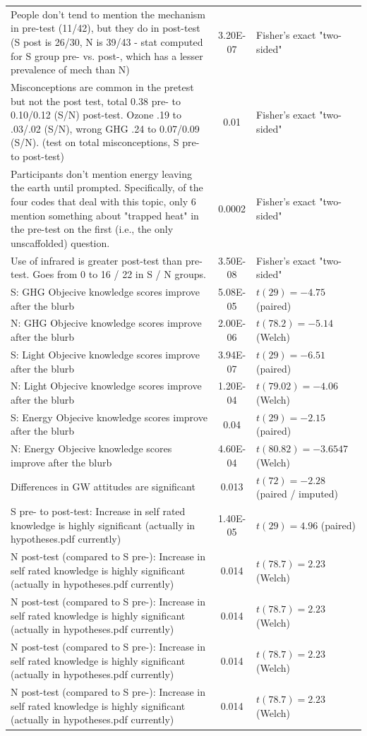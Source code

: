 \begin{longtabu}{X[2.5]S[table-parse-only]X[l]}
People don't tend to mention the mechanism in pre-test (11/42), but they do in
post-test (S post is 26/30, N is 39/43 - stat computed for S group pre- vs.
post-, which has a lesser prevalence of mech than N) & 3.20E-07 &
Fisher's exact "two-sided" \\
Misconceptions are common in the pretest but not the post test, total 0.38 pre-
to 0.10/0.12 (S/N) post-test. Ozone .19 to .03/.02 (S/N),  wrong GHG  .24 to
0.07/0.09 (S/N). (test on total misconceptions, S pre- to post-test) & 0.01
& Fisher's exact "two-sided" \\
Participants don't mention energy leaving the earth until prompted.
Specifically, of the four codes that deal with this topic, only 6 mention
something about "trapped heat" in the pre-test on the first (i.e., the only
unscaffolded) question. & 0.0002 & Fisher's exact "two-sided" \\
Use of infrared is greater post-test than pre-test. Goes from 0 to 16 / 22 in S
/ N groups. & 3.50E-08 & Fisher's exact "two-sided" \\
S: GHG Objecive knowledge scores improve after the blurb & 5.08E-05 &
$t(29) = -4.75$ (paired) \\
N: GHG Objecive knowledge scores improve after the blurb & 2.00E-06 &
$t(78.2) = -5.14$ (Welch) \\
S: Light Objecive knowledge scores improve after the blurb & 3.94E-07 &
$t(29) = -6.51$ (paired) \\
N: Light Objecive knowledge scores improve after the blurb & 1.20E-04 &
$t(79.02) = -4.06$ (Welch) \\
S: Energy Objecive knowledge scores improve after the blurb & 0.04 &
$t(29) = -2.15$ (paired) \\
N: Energy Objecive knowledge scores improve after the blurb & 4.60E-04 &
$t(80.82) = -3.6547$ (Welch) \\
Differences in GW attitudes are significant & 0.013 & $t(72) = -2.28$
(paired / imputed) \\
S pre- to post-test: Increase in self rated knowledge is highly significant
(actually in hypotheses.pdf currently) & 1.40E-05 & $t(29) = 4.96$
(paired) \\
N post-test (compared to S pre-): Increase in self rated knowledge  is highly
significant (actually in hypotheses.pdf currently) & 0.014 & $t(78.7) = 2.23$ (Welch) \\
N post-test (compared to S pre-): Increase in self rated knowledge  is highly
significant (actually in hypotheses.pdf currently) & 0.014 & $t(78.7) = 2.23$ (Welch) \\
N post-test (compared to S pre-): Increase in self rated knowledge  is highly
significant (actually in hypotheses.pdf currently) & 0.014 & $t(78.7) = 2.23$ (Welch) \\
N post-test (compared to S pre-): Increase in self rated knowledge  is highly
significant (actually in hypotheses.pdf currently) & 0.014 & $t(78.7) = 2.23$ (Welch)
\end{longtabu}

